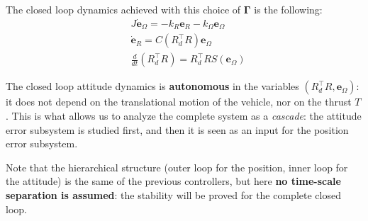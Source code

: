 \documentclass[10pt, a4paper]{report}
\begin{document}
The closed loop dynamics achieved with this choice of $\boldsymbol{\Gamma}$ is the following:\begin{align}
    &J\dot{\mathbf e}_\Omega=-k_R\mathbf e_R-k_\Omega\mathbf e_\Omega\\ 
    &\dot{\mathbf e}_R=C(R_d^\top R)\mathbf e_\Omega\\
    &\frac{d}{dt}(R_d^\top R)=R_d^\top RS(\mathbf e_\Omega)
\end{align}
\begin{boxobservation}{}{}
The closed loop attitude dynamics is \textbf{autonomous} in the variables $(R_d^\top R,\mathbf e_\Omega)$: it does not depend on the translational motion of the vehicle, nor on the thrust $T$. This is what allows us to analyze the complete system as a \textit{cascade}: the attitude error subsystem is studied first, and then it is seen as an input for the position error subsystem.
\end{boxobservation}
\noindent Note that the hierarchical structure (outer loop for the position, inner loop for the attitude) is the same of the previous controllers, but here \textbf{no time-scale separation is assumed}: the stability will be proved for the complete closed loop.
\end{document}
